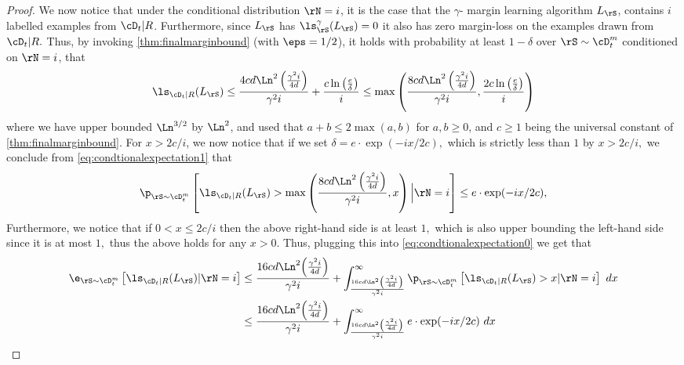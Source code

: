 \begin{proof}
    We now notice that under the conditional distribution $ \rN=i $, it is the case that the $ \gamma $- margin learning algorithm $ L_{\rS} $, contains $ i $ labelled examples from $ \cD_{t}|R $. Furthermore, since $L_{\rS}  $ has     $ \ls_{\rS}^{\gamma}(L_{\rS})=0 $ it also has zero margin-loss on the examples drawn from $ \cD_{t}|R.$ Thus, by invoking \cref{thm:finalmarginbound} (with $ \eps=1/2 $), it holds with probability at least $ 1-\delta $ over $ \rS \sim \cD_{t}^{m}$ conditioned on $ \rN=i $, that  
    \begin{align}\label{eq:condtionalexpectation1}
      \ls_{\cD_{t}|R}(L_{\rS})\leq \frac{4cd\Ln^{2}\left(\frac{\gamma^{2}i}{4d}\right)}{\gamma^{2}i}+ \frac{c\ln{\left(\frac{e}{\delta} \right)}}{i}
      \leq \max\left(\frac{8cd\Ln^{2}\left(\frac{\gamma^{2}i}{4d}\right)}{\gamma^{2}i}, \frac{2c\ln{\left(\frac{e}{\delta} \right)}}{i}\right)
    \end{align}  
    where we have upper bounded $ \Ln^{3/2} $ by $ \Ln^{2}$, and used that $ a+b\leq 2\max(a,b) $ for $ a,b\geq0 $, and $ c\geq 1$ being the universal constant of \cref{thm:finalmarginbound}. 
    For $ x>2c/i $, we now notice that if we set $ \delta=e\cdot \exp(-ix/2c),$ which is strictly less than $1  $ by $ x>2c/i,$ we conclude from \cref{eq:condtionalexpectation1}  that
    \begin{align*} 
        \p_{\rS\sim \cD^{m}_{t}}\left[\ls_{\cD_{t}|R}(L_{\rS})
        > \max\left(\frac{8cd\Ln^{2}\left(\frac{\gamma^{2}i}{4d}\right)}{\gamma^{2}i},x\right)\Big|\rN=i\right]\leq e\cdot \exp(-ix/2c),
      \end{align*}  
    Furthermore, we notice that if $ 0<x\leq 2c/i $ then the above right-hand side is at least $ 1,$ which is also upper bounding the left-hand side since it is at most $ 1,$ thus the above holds for any  $ x>0. $ 
    Thus, plugging this into \cref{eq:condtionalexpectation0} we get that 
    \begin{align*}
        \e_{\rS\sim\cD_{t}^{m}}\left[\ls_{\cD_{t}|R}(L_{\rS})|\rN=i\right]
        &\leq \frac{16cd\Ln^{2}{\left( \frac{\gamma^{2}i}{4d}\right)}}{\gamma^{2}i}+\int_{\frac{16cd\Ln^{2}{\left( \frac{\gamma^{2}i}{4d}\right)}}{\gamma^{2}i}}^{\infty} \p_{\rS\sim\cD^{m}_{t}}\left[\ls_{\cD_{t}|R}(L_{\rS})> x|\rN=i \right] \ dx
        \\
        &\leq \frac{16cd\Ln^{2}{\left( \frac{\gamma^{2}i}{4d}\right)}}{\gamma^{2}i}+\int_{\frac{16cd\Ln^{2}{\left( \frac{\gamma^{2}i}{4d}\right)}}{\gamma^{2}i}}^{\infty} e\cdot \exp(-ix/2c) \ dx 
        \\

\end{align*}
\end{proof}
